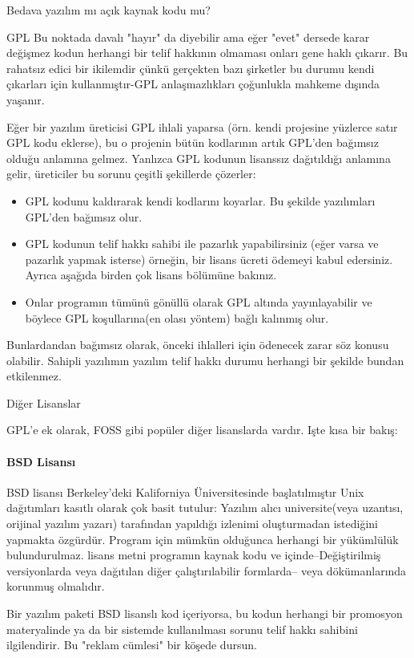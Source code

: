 \begin{section}{Bedava yazılım mı açık kaynak kodu mu?}
\begin{subsection}{GPL}
Bu noktada davalı "hayır" da diyebilir ama eğer "evet" dersede karar değişmez kodun herhangi bir telif hakkının olmaması onları gene haklı çıkarır. Bu rahatsız edici bir ikilemdir çünkü gerçekten bazı şirketler bu durumu kendi çıkarları için kullanmıştır-GPL anlaşmazlıkları çoğunlukla mahkeme dışında yaşanır.

Eğer bir yazılım üreticisi GPL ihlali yaparsa (örn. kendi projesine yüzlerce satır GPL kodu eklerse), bu o projenin bütün kodlarının artık GPL'den bağımsız olduğu anlamına gelmez. Yanlızca GPL kodunun lisanssız dağıtıldığı anlamına gelir, üreticiler  bu sorunu çeşitli şekillerde çözerler:
\begin{itemize}
 \item GPL kodunu kaldırarak kendi kodlarını koyarlar. Bu şekilde yazılımları GPL'den bağımsız olur.
 \item GPL kodunun telif hakkı sahibi ile pazarlık yapabilirsiniz (eğer varsa ve pazarlık yapmak isterse) örneğin, bir lisans ücreti ödemeyi kabul edersiniz.
Ayrıca aşağıda birden çok lisans bölümüne bakınız.
 \item Onlar programın tümünü gönüllü olarak GPL altında  yayınlayabilir ve böylece GPL koşullarına(en olası yöntem) bağlı kalınmış olur.
 \end{itemize}

Bunlardandan bağımsız olarak, önceki ihlalleri için ödenecek zarar söz konusu olabilir. Sahipli yazılımın yazılım telif hakkı durumu  herhangi bir şekilde bundan etkilenmez.
\end{subsection}
\begin{subsection}{Diğer Lisanslar}

GPL'e ek olarak, FOSS gibi popüler diğer lisanslarda vardır. Işte kısa bir bakış:

\paragraph{BSD Lisansı}{BSD lisansı Berkeley'deki Kaliforniya Üniversitesinde başlatılmıştır Unix dağıtımları kasıtlı olarak çok basit tutulur: Yazılım alıcı universite(veya uzantısı, orijinal yazılım yazarı)  tarafından yapıldığı izlenimi oluşturmadan istediğini yapmakta özgürdür. Program için mümkün olduğunca herhangi bir yükümlülük bulundurulmaz. lisans metni programın kaynak kodu ve içinde--Değiştirilmiş versiyonlarda veya dağıtılan diğer çalıştırılabilir formlarda-- veya dökümanlarında korunmuş olmalıdır.}

Bir yazılım paketi BSD lisanslı kod içeriyorsa, bu kodun herhangi bir promosyon materyalinde ya da bir sistemde kullanılması sorunu  telif hakkı sahibini ilgilendirir. Bu "reklam cümlesi" bir köşede dursun.


\end{subsection}
\end{section}
